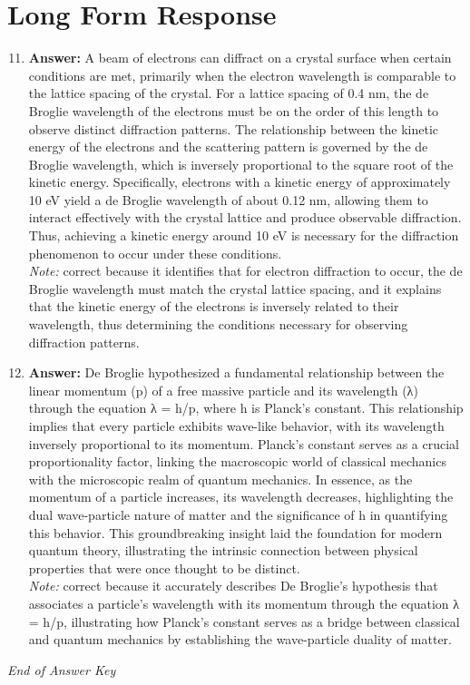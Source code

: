 \documentclass[12pt]{article}
\begin{document}
\section*{Long Form Response}
\begin{enumerate}[label=\arabic*.]
\setcounter{enumi}{10}
\item \textbf{Answer:} A beam of electrons can diffract on a crystal surface when certain conditions are met, primarily when the electron wavelength is comparable to the lattice spacing of the crystal. For a lattice spacing of 0.4 nm, the de Broglie wavelength of the electrons must be on the order of this length to observe distinct diffraction patterns. The relationship between the kinetic energy of the electrons and the scattering pattern is governed by the de Broglie wavelength, which is inversely proportional to the square root of the kinetic energy. Specifically, electrons with a kinetic energy of approximately 10 eV yield a de Broglie wavelength of about 0.12 nm, allowing them to interact effectively with the crystal lattice and produce observable diffraction. Thus, achieving a kinetic energy around 10 eV is necessary for the diffraction phenomenon to occur under these conditions.
\\ \textit{Note:} correct because it identifies that for electron diffraction to occur, the de Broglie wavelength must match the crystal lattice spacing, and it explains that the kinetic energy of the electrons is inversely related to their wavelength, thus determining the conditions necessary for observing diffraction patterns.
\item \textbf{Answer:} De Broglie hypothesized a fundamental relationship between the linear momentum (p) of a free massive particle and its wavelength (λ) through the equation λ = h/p, where h is Planck's constant. This relationship implies that every particle exhibits wave-like behavior, with its wavelength inversely proportional to its momentum. Planck's constant serves as a crucial proportionality factor, linking the macroscopic world of classical mechanics with the microscopic realm of quantum mechanics. In essence, as the momentum of a particle increases, its wavelength decreases, highlighting the dual wave-particle nature of matter and the significance of h in quantifying this behavior. This groundbreaking insight laid the foundation for modern quantum theory, illustrating the intrinsic connection between physical properties that were once thought to be distinct.
\\ \textit{Note:} correct because it accurately describes De Broglie's hypothesis that associates a particle's wavelength with its momentum through the equation λ = h/p, illustrating how Planck's constant serves as a bridge between classical and quantum mechanics by establishing the wave-particle duality of matter.
\end{enumerate}

\vfill
\noindent\textit{End of Answer Key}
\end{document}
